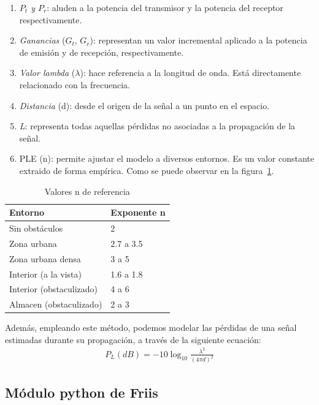 \begin{enumerate}
    \item \emph{$P_t$ y $P_r$}: aluden a la potencia del transmisor y la potencia del receptor respectivamente.
    \item \emph{Ganancias} ($G_t$, $G_r$): representan un valor incremental aplicado a la potencia de emisión y de recepción, respectivamente.
    \item \emph{Valor lambda} ($\lambda$): hace referencia a la longitud de onda. Está directamente relacionado con la frecuencia.
    \item \emph{Distancia} (d): desde el origen de la señal a un punto en el espacio.
    \item \emph{L}: representa todas aquellas pérdidas no asociadas a la propagación de la señal.
    \item \ac{PLE} (n): permite ajustar el modelo a diversos entornos. Es un valor constante extraido de forma empírica. Como se puede observar en la figura~\ref{table:ple_table}.
\end{enumerate}

\begin{table} [t]
    \centering
    \begin{tabular}{|l|l|}
    \hline
    Entorno                     & Exponente n \\
    \hline
    Sin obstáculos              & 2 \\
    Zona urbana                 & 2.7 a 3.5\\
    Zona urbana densa           & 3 a 5  \\
    Interior (a la vista)       & 1.6 a 1.8 \\
    Interior (obstaculizado)    & 4 a 6 \\
    Almacen (obstaculizado)     & 2 a 3 \\
    \hline
    \end{tabular}
    \caption[Valores n de referencia]{Valores n de referencia}
    \label{table:ple_table}
\end{table}

Además, empleando este método, podemos modelar las pérdidas de una señal estimadas durante su propagación, a través de la siguiente ecuación:\\

\begin{align}
    P_L(dB) = -10 \log_{10} \frac{\lambda^2}{(4 \pi d)^2}
\end{align}

\subsection{Módulo python de Friis}
\label{subsec:friis-module}


